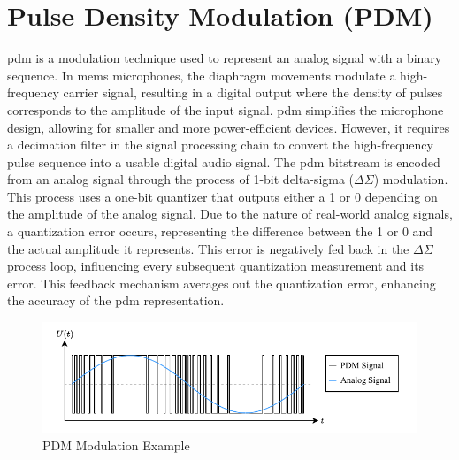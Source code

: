 \section{Pulse Density Modulation (PDM)}
\acrfull{pdm} is a modulation technique used to represent an analog signal with a binary sequence.
In \acrshort{mems} microphones, the diaphragm movements modulate a high-frequency carrier signal,
resulting in a digital output where the density of pulses corresponds to the amplitude of the input signal.
\acrshort{pdm} simplifies the microphone design, allowing for smaller and more power-efficient devices.
However, it requires a decimation filter in the signal processing chain to convert the high-frequency pulse sequence into a usable digital audio signal.
The \acrshort{pdm} bitstream is encoded from an analog signal through the process of 1-bit delta-sigma (\(\Delta \Sigma\)) modulation.
This process uses a one-bit quantizer that outputs either a 1 or 0 depending on the amplitude of the analog signal.
Due to the nature of real-world analog signals, a quantization error occurs, representing the difference between the 1 or 0 and the actual amplitude it represents.
This error is negatively fed back in the \(\Delta \Sigma\) process loop, influencing every subsequent quantization measurement and its error.
This feedback mechanism averages out the quantization error, enhancing the accuracy of the \acrshort{pdm} representation.
\begin{figure}[h]
	\centering
	\includegraphics[width=1.0\textwidth]{images/2_preliminaries/pdm_modulation.pdf}
	\caption{PDM Modulation Example}
	\label{fig:pdm_modulation}
\end{figure}
\vfill


